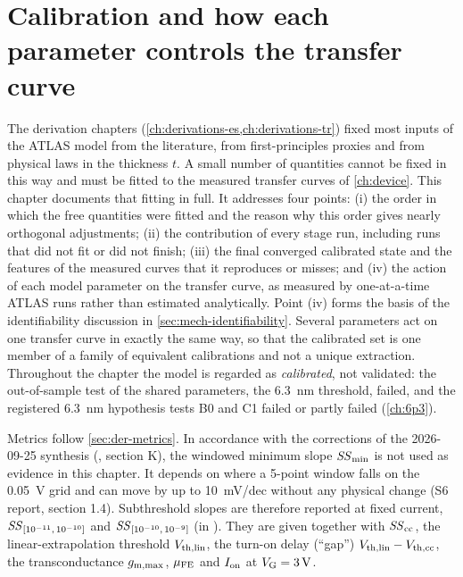 \chapter{Calibration and how each parameter controls the transfer curve}\label{ch:calibration}

The derivation chapters (\cref{ch:derivations-es,ch:derivations-tr}) fixed most inputs of the ATLAS model from the literature, from first-principles proxies and from physical laws in the thickness $t$. A small number of quantities cannot be fixed in this way and must be fitted to the measured transfer curves of \cref{ch:device}. This chapter documents that fitting in full. It addresses four points: (i) the order in which the free quantities were fitted and the reason why this order gives nearly orthogonal adjustments; (ii) the contribution of every stage run, including runs that did not fit or did not finish; (iii) the final converged calibrated state and the features of the measured curves that it reproduces or misses; and (iv) the action of each model parameter on the transfer curve, as measured by one-at-a-time ATLAS runs rather than estimated analytically. Point (iv) forms the basis of the identifiability discussion in \cref{sec:mech-identifiability}. Several parameters act on one transfer curve in exactly the same way, so that the calibrated set is one member of a family of equivalent calibrations and not a unique extraction. Throughout the chapter the model is regarded as \emph{calibrated}, not validated: the out-of-sample test of the shared parameters, the 6.3~nm threshold, failed, and the registered 6.3~nm hypothesis tests B0 and C1 failed or partly failed (\cref{ch:6p3}).

Metrics follow \cref{sec:der-metrics}. In accordance with the corrections of the 2026-09-25 synthesis (, section K), the windowed minimum slope $\mathit{SS}_{\min}$ is not used as evidence in this chapter. It depends on where a 5-point window falls on the 0.05~V grid and can move by up to 10~mV/dec without any physical change (S6 report, section 1.4). Subthreshold slopes are therefore reported at fixed current, $\mathit{SS}_{[10^{-11},\,10^{-10}]}$ and $\mathit{SS}_{[10^{-10},\,10^{-9}]}$ (in \Aum). They are given together with $\mathit{SS}_{\mathrm{cc}}$, the linear-extrapolation threshold $V_{\mathrm{th,lin}}$, the turn-on delay (``gap'') $V_{\mathrm{th,lin}}-V_{\mathrm{th,cc}}$, the transconductance $g_{\mathrm{m,max}}$, $\mu_{\mathrm{FE}}$ and $I_{\mathrm{on}}$ at $V_{\mathrm{G}}=\SI{3}{V}$.

